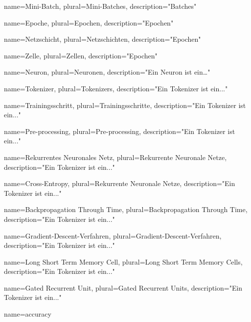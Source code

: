 \usepackage{glossaries}

\makeglossaries

{
name=Mini-Batch,
plural=Mini-Batches,
description="Batches"
}

{
name=Epoche,
plural=Epochen,
description="Epochen"
}

{
name=Netzschicht,
plural=Netzschichten,
description="Epochen"
}


{
name=Zelle,
plural=Zellen,
description="Epochen"
}

{
name=Neuron,
plural=Neuronen,
description="Ein Neuron ist ein…"
}

{
name=Tokenizer,
plural=Tokenizers,
description="Ein Tokenizer ist ein..."
}

{
name=Trainingsschritt,
plural=Trainingsschritte,
description="Ein Tokenizer ist ein..."
}

{
name=Pre-processing,
plural=Pre-processing,
description="Ein Tokenizer ist ein..."
}

{
name=Rekurrentes Neuronales Netz,
plural=Rekurrente Neuronale Netze,
description="Ein Tokenizer ist ein..."
}

{
name=Cross-Entropy,
plural=Rekurrente Neuronale Netze,
description="Ein Tokenizer ist ein..."
}

{
name=Backpropagation Through Time,
plural=Backpropagation Through Time,
description="Ein Tokenizer ist ein..."
}

{
name=Gradient-Descent-Verfahren,
plural=Gradient-Descent-Verfahren,
description="Ein Tokenizer ist ein..."
}

{
name=Long Short Term Memory Cell,
plural=Long Short Term Memory Cells,
description="Ein Tokenizer ist ein..."
}

{
name=Gated Recurrent Unit,
plural=Gated Recurrent Units,
description="Ein Tokenizer ist ein..."
}


{
name=accuracy
}

